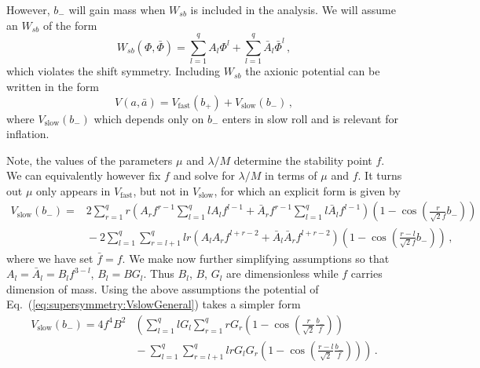\documentclass[12pt]{article}
\begin{document}
However, $b_-$ will gain mass when $W_{sb}$ is included in the analysis.
We will assume an $W_{sb}$ of the form
\begin{equation} \label{eq:supersymmetry:Wsb}
  W_{sb}\left(\Phi, \bar\Phi\right) =
      \sum_{l = 1}^q A_l \Phi^l
    + \sum_{l = 1}^q \bar A_l \bar\Phi^l\,,
\end{equation}
which violates the shift symmetry.
Including $W_{sb}$ the axionic potential can be written in the form
\begin{equation}
  V\left(a, \bar a\right) = V_\text{fast}\left(b_+\right) + V_\text{slow}\left(b_-\right)\,,
\end{equation}
where $V_\text{slow}\left(b_-\right)$ which depends only on $b_-$ enters in slow roll and is relevant for inflation.

Note, the values of the parameters $\mu$ and $\lambda / M$ determine the stability point $f$.
We can equivalently however fix $f$ and solve for $\lambda / M$ in terms of $\mu$ and $f$.
It turns out $\mu$ only appears in $V_\text{fast}$, but not in $V_\text{slow}$, for which an explicit form is given by
\begin{equation} \label{eq:supersymmetry:VslowGeneral}
  \begin{aligned}
    V_\text{slow}\left(b_-\right) =
      &2 \sum_{r = 1}^q r
        \left(A_r f^{r - 1} \sum_{l = 1}^q l A_l f^{l - 1}
          + \bar A_r f^{r - 1} \sum_{l = 1}^q l \bar A_l f^{l - 1}\right)
        \left(1 - \cos\left(\frac{r}{\sqrt 2 f} b_-\right)\right)\\
      &{} - 2 \sum_{l = 1}^q \sum_{r = l + 1}^q
        l r \left(A_l A_r f^{l + r - 2} + \bar A_l \bar A_r f^{l + r - 2}\right)
        \left(1 - \cos\left(\frac{r - l}{\sqrt 2 f} b_-\right)\right)\,,
  \end{aligned}
\end{equation}
where we have set $\bar f = f$.
We make now further simplifying assumptions so that $A_l = \bar A_l = B_l f^{3 - l}$, $B_l = B G_l$.
Thus $B_l$, $B$, $G_l$ are dimensionless while $f$ carries dimension of mass.
Using the above assumptions the potential of Eq.~(\ref{eq:supersymmetry:VslowGeneral}) takes a simpler form
\begin{equation} \label{eq:supersymmetry:Vslow}
  \begin{aligned}
    V_\text{slow}\left(b_-\right) = 4 f^4 B^2 &\left(
      \sum_{l = 1}^q l G_l \sum_{r = 1}^q r G_r
        \left(1 - \cos\left(\frac{r}{\sqrt{2}} \frac{b_-}{f}\right)\right)\right. \\
      &\left.{} - \sum_{l = 1}^q \sum_{r = l + 1}^q l r G_l G_r
        \left(1 - \cos\left(\frac{r - l}{\sqrt{2}} \frac{b_-}{f}\right)\right)
    \right)\,.
  \end{aligned}
\end{equation}
\end{document}
